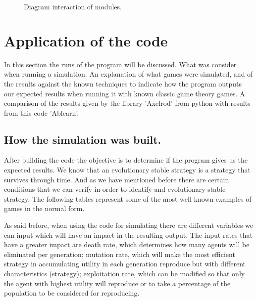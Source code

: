 \documentclass{book}
\begin{document}
\begin{figure}[H]
\caption{Diagram interaction of modules.}
\label{fig:diagoverall}
\end{figure}



\newpage
\section{Application of the code}


In this section the runs of the program will be discussed. What was consider when running a simulation. An explanation of what games were simulated, and of the results against the known techniques to indicate how the program outputs our expected results when running it with known classic game theory games. A comparison of the results given by the  library 'Axelrod' from python with results from this code 'Ablearn'.

\subsection{How the simulation was built.}
After building the code the objective is to determine if the program gives us the expected results. We know that an evolutionary stable strategy is a strategy that survives through time. And as we have mentioned before there are certain conditions that we can verify in order to identify and evolutionary stable strategy. The following tables represent some of the most well known examples of games in the normal form. 

As said before, when using the code for simulating there are different variables we can input which will have an impact in the resulting output. The input rates that have a greater impact are death rate, which determines how many agents will be eliminated per generation; mutation rate, which will make the most efficient strategy in accumulating utility in each generation reproduce but with different characteristics (strategy); exploitation rate, which can be modified so that only the agent with highest utility will reproduce or to take a percentage of the population to be considered for reproducing.
\end{document}
